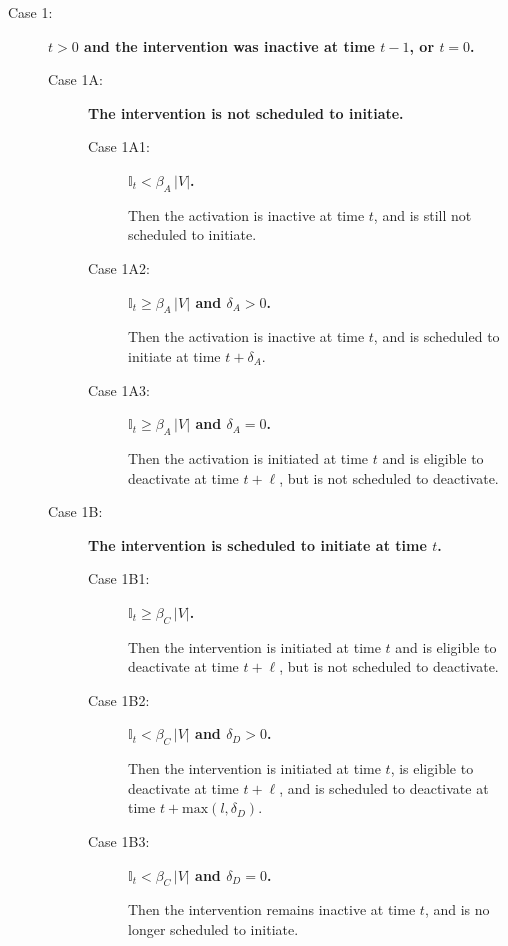 \documentclass[11pt]{article}
\newcommand{\istate}{\mbox{$\mathbb{I}$}}
\begin{document}
\begin{description}
\item
[Case 1:]
{\bf $t > 0$ and the intervention was inactive at time $t\!-\!1$, or $t= 0$.}
\begin{description}
\item
[Case 1A:]
{\bf The intervention is not scheduled to initiate.}

\begin{description}
\item
[Case 1A1:] 
{\bf $\istate_t<\beta_A \, |V|$.}

Then the activation is inactive at time $t$, and is still not scheduled to initiate.

\item
[Case 1A2:] 
{\bf $\istate_t \geq \beta_A \, |V|$ and $\delta_A > 0$.}

Then the activation is inactive at time $t$, and is scheduled to initiate at time $t + \delta_A$.

\item
[Case 1A3:] 
{\bf $\istate_t \geq \beta_A \, |V|$ and $\delta_A = 0$.}

Then the activation is initiated at time $t$
and is eligible to deactivate at time $t+\ell$,
but is not scheduled to deactivate.

\end{description}

\item
[Case 1B:]
{\bf The intervention is scheduled to initiate at time $t$.}

\begin{description}
\item
[Case 1B1:] 
{\bf $\istate_t \geq \beta_C \, |V|$.}

Then the intervention is initiated at time $t$ and is eligible to deactivate at time $t+\ell$,
but is not scheduled to deactivate.

\item
[Case 1B2:] 
{\bf $\istate_t < \beta_C \, |V|$ and $\delta_D > 0$.}

Then the intervention is initiated at time $t$, is eligible to deactivate at time $t+\ell$,
and is scheduled to deactivate at time $t + \mbox{max}(l, \delta_D)$.

\item
[Case 1B3:] 
{\bf $\istate_t < \beta_C \, |V|$ and $\delta_D = 0$.}

Then the intervention remains inactive at time $t$, and is no longer scheduled to initiate.
\end{description}


\end{description}
\end{description}
\end{document}
